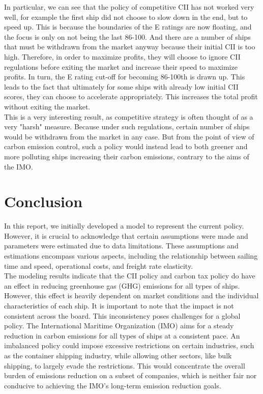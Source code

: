 \documentclass[a4paper,12pt]{article}
\begin{document}
In particular, we can see that the policy of competitive CII has not worked very well, for example the first ship did not choose to slow down in the end, but to speed up.
This is because the boundaries of the E ratings are now floating, and the focus is only on not being the last 86-100.
And there are a number of ships that must be withdrawn from the market anyway because their initial CII is too high.
Therefore, in order to maximize profits, they will choose to ignore CII regulations before exiting the market and increase their speed to maximize profits.
In turn, the E rating cut-off for becoming 86-100th is drawn up. This leads to the fact that ultimately for some ships with already low initial CII scores, they can choose to accelerate appropriately.
This increases the total profit without exiting the market.\\

This is a very interesting result, as competitive strategy is often thought of as a very "harsh" measure.
Because under such regulations, certain number of ships would be withdrawn from the market in any case.
But from the point of view of carbon emission control, such a policy would instead lead to both greener and more polluting ships increasing their carbon emissions, contrary to the aims of the IMO.

\newpage
\section{Conclusion}

In this report, we initially developed a model to represent the current policy.
However, it is crucial to acknowledge that certain assumptions were made and parameters were estimated due to data limitations.
These assumptions and estimations encompass various aspects, including the relationship between sailing time and speed, operational costs, and freight rate elasticity.\\

The modeling results indicate that the CII policy and carbon tax policy do have an effect in reducing greenhouse gas (GHG) emissions for all types of ships.
However, this effect is heavily dependent on market conditions and the individual characteristics of each ship.
It is important to note that the impact is not consistent across the board.
This inconsistency poses challenges for a global policy.
The International Maritime Organization (IMO) aims for a steady reduction in carbon emissions for all types of ships at a consistent pace.
An imbalanced policy could impose excessive restrictions on certain industries, such as the container shipping industry, while allowing other sectors, like bulk shipping, to largely evade the restrictions.
This would concentrate the overall burden of emissions reduction on a subset of companies, which is neither fair nor conducive to achieving the IMO's long-term emission reduction goals.\\
\end{document}
